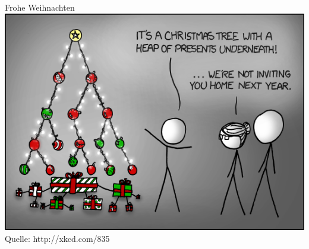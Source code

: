\documentclass[18pt]{beamer}
\begin{document}
\begin{frame}{Frohe Weihnachten}
 \includegraphics[scale=0.5]{08_tree}
 Quelle: http://xkcd.com/835
\end{frame}
\end{document}

